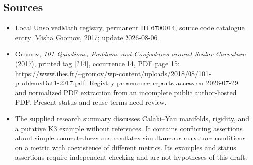\documentclass[11pt]{article}
\begin{document}
\subsection{Sources}
\begin{itemize}
\item Local UnsolvedMath registry, permanent ID 6700014, source code catalogue entry; Misha Gromov, 2017; update 2026-08-06.
\item Gromov, \emph{101 Questions, Problems and Conjectures around Scalar Curvature} (2017), printed tag [?14], occurrence 14, PDF page 15: \url{https://www.ihes.fr/~gromov/wp-content/uploads/2018/08/101-problemsOct1-2017.pdf}. Registry provenance reports access on 2026-07-29 and normalized PDF extraction from an incomplete public author-hosted PDF. Present status and reuse terms need review.
\item The supplied research summary discusses Calabi--Yau manifolds, rigidity, and a putative K3 example without references. It contains conflicting assertions about simple connectedness and conflates simultaneous curvature conditions on a metric with coexistence of different metrics. Its examples and status assertions require independent checking and are not hypotheses of this draft.
\end{itemize}
\end{document}
